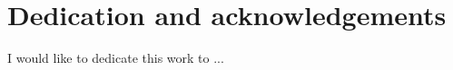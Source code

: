 %
%
\chapter{Dedication and acknowledgements}
\begin{SingleSpace}

I would like to dedicate this work to ...

\end{SingleSpace}
\clearpage
